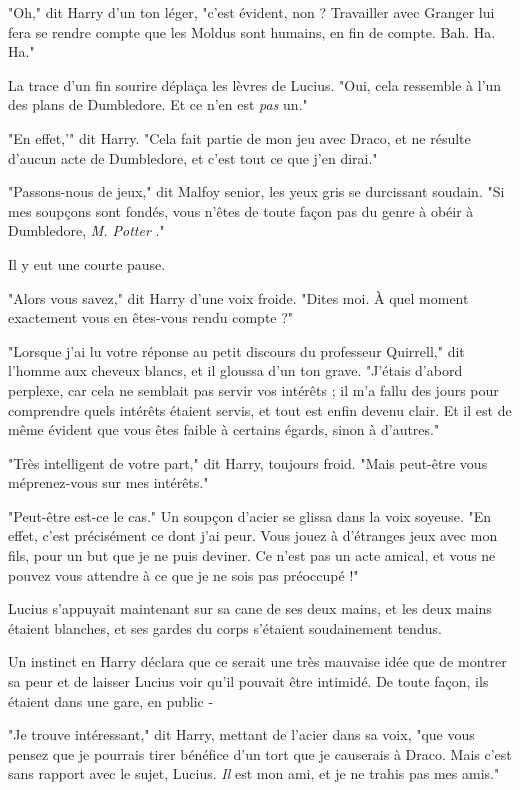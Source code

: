 "Oh," dit Harry d'un ton léger, "c'est évident, non ? Travailler avec Granger lui fera se rendre compte que les Moldus sont humains, en fin de compte. Bah. Ha. Ha."

La trace d'un fin sourire déplaça les lèvres de Lucius. "Oui, cela ressemble à l'un des plans de Dumbledore. Et ce n'en est \emph{pas}  un."

"En effet,'" dit Harry. "Cela fait partie de mon jeu avec Draco, et ne résulte d'aucun acte de Dumbledore, et c'est tout ce que j'en dirai."

"Passons-nous de jeux," dit Malfoy senior, les yeux gris se durcissant soudain. "Si mes soupçons sont fondés, vous n'êtes de toute façon pas du genre à obéir à Dumbledore, \emph{M. Potter} ."

Il y eut une courte pause.

"Alors vous savez," dit Harry d'une voix froide. "Dites moi. À quel moment exactement vous en êtes-vous rendu compte ?"

"Lorsque j'ai lu votre réponse au petit discours du professeur Quirrell," dit l'homme aux cheveux blancs, et il gloussa d'un ton grave. "J'étais d'abord perplexe, car cela ne semblait pas servir vos intérêts ; il m'a fallu des jours pour comprendre quels intérêts étaient servis, et tout est enfin devenu clair. Et il est de même évident que vous êtes faible à certains égards, sinon à d'autres."

"Très intelligent de votre part," dit Harry, toujours froid. "Mais peut-être vous méprenez-vous sur mes intérêts."

"Peut-être est-ce le cas." Un soupçon d'acier se glissa dans la voix soyeuse. "En effet, c'est précisément ce dont j'ai peur. Vous jouez à d'étranges jeux avec mon fils, pour un but que je ne puis deviner. Ce n'est pas un acte amical, et vous ne pouvez vous attendre à ce que je ne sois pas préoccupé !"

Lucius s'appuyait maintenant sur sa cane de ses deux mains, et les deux mains étaient blanches, et ses gardes du corps s'étaient soudainement tendus.

Un instinct en Harry déclara que ce serait une très mauvaise idée que de montrer sa peur et de laisser Lucius voir qu'il pouvait être intimidé. De toute façon, ils étaient dans une gare, en public -

"Je trouve intéressant," dit Harry, mettant de l'acier dans sa voix, "que vous pensez que je pourrais tirer bénéfice d'un tort que je causerais à Draco. Mais c'est sans rapport avec le sujet, Lucius. \emph{Il}  est mon ami, et je ne trahis pas mes amis."

